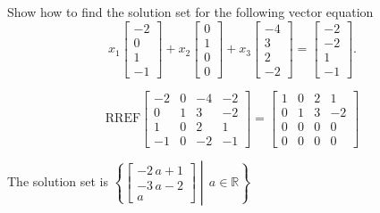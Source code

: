 
\begin{exerciseStatement}


Show how to find the solution set for the following vector equation \[ x_{1} \left[\begin{array}{c}
-2 \\
0 \\
1 \\
-1
\end{array}\right] + x_{2} \left[\begin{array}{c}
0 \\
1 \\
0 \\
0
\end{array}\right] + x_{3} \left[\begin{array}{c}
-4 \\
3 \\
2 \\
-2
\end{array}\right] = \left[\begin{array}{c}
-2 \\
-2 \\
1 \\
-1
\end{array}\right] .\]


\end{exerciseStatement}
    
\begin{exerciseAnswer} 
\[\mathrm{RREF} \left[\begin{array}{ccc|c}
-2 & 0 & -4 & -2 \\
0 & 1 & 3 & -2 \\
1 & 0 & 2 & 1 \\
-1 & 0 & -2 & -1
\end{array}\right]  =  \left[\begin{array}{ccc|c}
1 & 0 & 2 & 1 \\
0 & 1 & 3 & -2 \\
0 & 0 & 0 & 0 \\
0 & 0 & 0 & 0
\end{array}\right] \]

The solution set is \( \left\{ \left[\begin{array}{c}
-2 \, a + 1 \\
-3 \, a - 2 \\
a
\end{array}\right] \middle|\,a\in\mathbb{R}\right\} \)


\end{exerciseAnswer}
    
